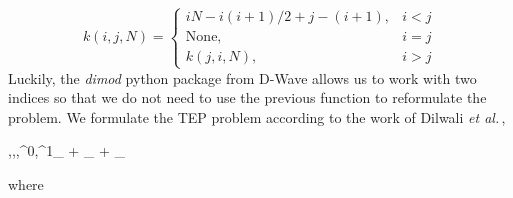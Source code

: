 \begin{equation}
k(i,j,N) = \begin{cases}
    iN - i\left(i+1\right)/2 + j - (i+1), & i<j\\
    \text{None},& i=j \\
    k(j,i,N), & i>j
\end{cases}
    \label{eq: TwoIndexesmap}
\end{equation}
Luckily, the \textit{dimod} python package from D-Wave allows us to work with two indices so that we do not need to use the previous function to reformulate the problem. We formulate the TEP problem according to the work of Dilwali \textit{et al.}\,\cite{Dilwali2016},
\begin{mini!}[2]
	{,,,^{0},^{1}}{_{} + _{} + _{}}{\label{eq: objective}}{}{}
\end{mini!}
where
